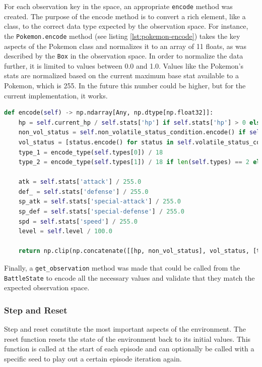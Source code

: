 For each observation key in the space, an appropriate \lstinline|encode| method was created. The purpose of the encode method
is to convert a rich element, like a class, to the correct data type expected by the observation space. For instance, the
\lstinline|Pokemon.encode| method (see listing \ref{lst:pokemon-encode}) takes the key aspects of the Pokemon class and normalizes it to an array of 11 floats,
as was described by the \lstinline|Box| in the observation space. In order to normalize the data further, it is limited to
values between 0.0 and 1.0. Values like the Pokemon's stats are normalized based on the current maximum base stat available to 
a Pokemon, which is 255. In the future this number could be higher, but for the current implementation, it works.  

\begin{lstlisting}[basicstyle=\fontsize{10}{10}\selectfont\ttfamily,language=Python,caption={The Pokemon encode method.},label=lst:pokemon-encode,breaklines]
def encode(self) -> np.ndarray[Any, np.dtype[np.float32]]:
    hp = self.current_hp / self.stats['hp'] if self.stats['hp'] > 0 else 0.0
    non_vol_status = self.non_volatile_status_condition.encode() if self.non_volatile_status_condition else 0.0
    vol_status = [status.encode() for status in self.volatile_status_conditions] if len(self.volatile_status_conditions) > 0 else [0.0]
    type_1 = encode_type(self.types[0]) / 18
    type_2 = encode_type(self.types[1]) / 18 if len(self.types) == 2 else 0.0

    atk = self.stats['attack'] / 255.0
    def_ = self.stats['defense'] / 255.0
    sp_atk = self.stats['special-attack'] / 255.0
    sp_def = self.stats['special-defense'] / 255.0
    spd = self.stats['speed'] / 255.0
    level = self.level / 100.0

    return np.clip(np.concatenate([[hp, non_vol_status], vol_status, [type_1, type_2, atk, def_, sp_atk, sp_def, spd, level]]).astype(np.float32), 0.0, 1.0)
\end{lstlisting}

Finally, a \lstinline|get_observation| method was made that could be called from the \lstinline|BattleState| to encode 
all the necessary values and validate that they match the expected observation space.

\subsubsection{Step and Reset}
Step and reset constitute the most important aspects of the environment. The reset function resets the state of the environment back to its initial values.
This function is called at the start of each episode and can optionally be called with a specific seed to play out a certain episode iteration again.

